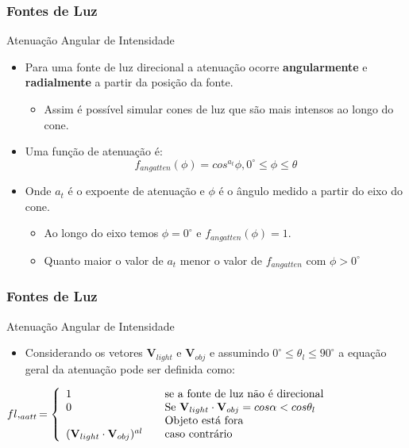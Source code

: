 \documentclass{beamer}
\begin{document}
\begin{frame}
\frametitle{Fontes de Luz}

	\begin{block}{Atenuação Angular de Intensidade}
		\begin{itemize}
			\item Para uma fonte de luz direcional a atenuação ocorre \textbf{angularmente} e \textbf{radialmente} a partir da posição da fonte.
			\begin{itemize}
				\item Assim é possível simular cones de luz que são mais intensos ao longo do cone.
			\end{itemize}	
			\item Uma função de atenuação é:
				\begin{equation*}
					f_{angatten}(\phi) = cos^{a_t} \phi, 0^\circ \leq \phi \leq \theta
				\end{equation*}	
			\item Onde $a_t$ é o expoente de atenuação e $\phi$ é o ângulo medido a partir do eixo do cone.
			\begin{itemize}
				\item Ao longo do eixo temos $\phi = 0^\circ$ e $f_{angatten}(\phi) = 1$.
				\item Quanto maior o valor de $a_t$ menor o valor de $f_{angatten}$ com $\phi > 0^\circ$
\end{itemize}													 
		\end{itemize}
	\end{block}
	
\end{frame}

\begin{frame}
\frametitle{Fontes de Luz}

	\begin{block}{Atenuação Angular de Intensidade}
		\begin{itemize}
			\item Considerando os vetores $\textbf{V}_{light}$ e $\textbf{V}_{obj}$ e assumindo $0^\circ \leq \theta_l \leq 90^\circ$ a equação geral da atenuação pode ser definida como:							
		\end{itemize}
		$fl,_{aatt}=\left\{
					\begin{array}{l l}
   						 1 & \quad \text{se a fonte de luz não é direcional}\\
   						 0 & \quad \text{Se } \textbf{V}_{light} \cdot \textbf{V}_{obj} = cos \alpha < cos \theta_l\\
   						  & \quad \text{Objeto está fora}\\
    						(\textbf{V}_{light} \cdot \textbf{V}_{obj})^{al} & \quad \text{caso contrário}
  					\end{array} \right.$
	\end{block}
	
	
\end{frame}
\end{document}
